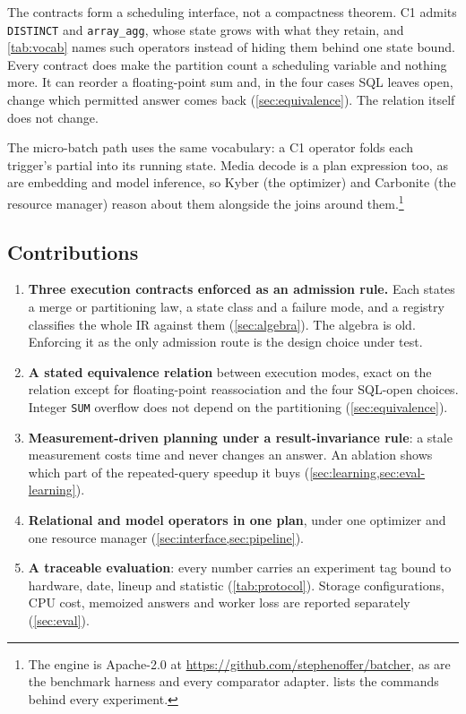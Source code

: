 \documentclass[10pt,twocolumn,letterpaper]{article}   %
\newcommand{\kyber}{Kyber}
\newcommand{\carbo}{Carbonite}
\newcommand{\Ca}{\textsc{C1}}
\begin{document}
The contracts form a scheduling interface, not a compactness theorem. \Ca{}
admits \texttt{DISTINCT} and \texttt{array\_agg}, whose state grows with what they retain, and
\cref{tab:vocab} names such operators instead of hiding them behind one state bound. Every
contract does make the partition count a scheduling variable and nothing more. It can reorder
a floating-point sum and, in the four cases SQL leaves open, change which permitted answer
comes back (\cref{sec:equivalence}). The relation itself does not change.

The micro-batch path uses the same vocabulary: a \Ca{} operator folds each trigger's partial
into its running state. Media decode is a plan expression too, as are embedding and model
inference, so \kyber{} (the optimizer) and \carbo{} (the resource manager) reason about them
alongside the joins around them.\footnote{The engine is Apache-2.0 at
\url{https://github.com/stephenoffer/batcher}, as are the benchmark harness and every
comparator adapter.  lists the commands behind every experiment.}

\subsection{Contributions}

\begin{enumerate}\itemsep1pt \parskip0pt 
\item \textbf{Three execution contracts enforced as an admission rule.} Each states a merge
or partitioning law, a state class and a failure mode, and a registry classifies the whole IR
against them (\cref{sec:algebra}). The algebra is old. Enforcing it as the only admission
route is the design choice under test.
\item \textbf{A stated equivalence relation} between execution modes, exact on the relation
except for floating-point reassociation and the four SQL-open choices. Integer \texttt{SUM}
overflow does not depend on the partitioning (\cref{sec:equivalence}).
\item \textbf{Measurement-driven planning under a result-invariance rule}: a stale measurement
costs time and never changes an answer. An ablation shows which part of the repeated-query
speedup it buys (\cref{sec:learning,sec:eval-learning}).
\item \textbf{Relational and model operators in one plan}, under one optimizer and one
resource manager (\cref{sec:interface,sec:pipeline}).
\item \textbf{A traceable evaluation}: every number carries an experiment tag bound to hardware,
date, lineup and statistic (\cref{tab:protocol}). Storage configurations, CPU cost, memoized
answers and worker loss are reported separately (\cref{sec:eval}).
\end{enumerate}
\end{document}
